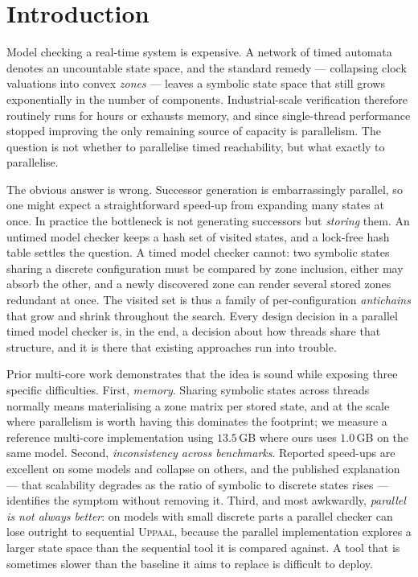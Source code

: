\section{Introduction}\label{sec:intro}

Model checking a real-time system is expensive. A network of timed automata denotes an
uncountable state space, and the standard remedy --- collapsing clock valuations into convex
\emph{zones} --- leaves a symbolic state space that still grows exponentially in the number of
components. Industrial-scale verification therefore routinely runs for hours or exhausts
memory, and since single-thread performance stopped improving the only remaining source of
capacity is parallelism. The question is not whether to parallelise timed reachability, but
what exactly to parallelise.

The obvious answer is wrong. Successor generation is embarrassingly parallel, so one might
expect a straightforward speed-up from expanding many states at once. In practice the
bottleneck is not generating successors but \emph{storing} them. An untimed model checker
keeps a hash set of visited states, and a lock-free hash table settles the question. A timed
model checker cannot: two symbolic states sharing a discrete configuration must be compared
by zone inclusion, either may absorb the other, and a newly discovered zone can render several
stored zones redundant at once. The visited set is thus a family of per-configuration
\emph{antichains} that grow and shrink throughout the search. Every design decision in a
parallel timed model checker is, in the end, a decision about how threads share that
structure, and it is there that existing approaches run into trouble.

Prior multi-core work demonstrates that the idea is sound while exposing three specific
difficulties. First, \emph{memory}. Sharing symbolic states across threads normally means
materialising a zone matrix per stored state, and at the scale where parallelism is worth
having this dominates the footprint; we measure a reference multi-core implementation using
$13.5$\,GB where ours uses $1.0$\,GB on the same model. Second, \emph{inconsistency across
benchmarks}. Reported speed-ups are excellent on some models and collapse on others, and the
published explanation --- that scalability degrades as the ratio of symbolic to discrete
states rises --- identifies the symptom without removing it. Third, and most awkwardly,
\emph{parallel is not always better}: on models with small discrete parts a parallel checker
can lose outright to sequential \textsc{Uppaal}, because the parallel implementation explores
a larger state space than the sequential tool it is compared against. A tool that is
sometimes slower than the baseline it aims to replace is difficult to deploy.

